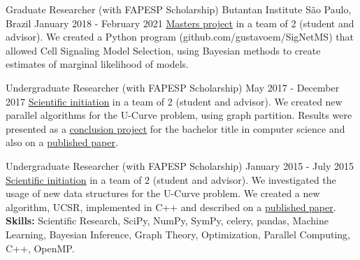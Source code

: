 \documentclass[11pt, a4paper]{awesome-cv-res}
\begin{document}
\begin{cventries}
\cventry
{Graduate Researcher (with FAPESP Scholarship)}
{Butantan Institute}
{São Paulo, Brazil}
{January 2018 - February 2021}
{\href{https://bv.fapesp.br/en/bolsas/175684/identification-of-cell-signaling-pathways-based-on-biochemical-reaction-kinetics-repositories/}
{\color{awesome}\underline {Masters project}} in a team of 2 (student 
    and advisor). We created a Python program 
    (github.com/gustavoem/SigNetMS) that allowed Cell Signaling Model
    Selection, using Bayesian methods to create estimates of marginal
    likelihood of models.
}

\cventry
{Undergraduate Researcher (with FAPESP Scholarship)}
{}
{}
{May 2017 - December 2017}
{\href{https://bv.fapesp.br/en/bolsas/170553/design-of-poset-forest-based-algorithms-for-the-u-curve-optimization-problem/}
{\color{awesome} \underline{Scientific initiation}} in a team of 2 
    (student and advisor). We created new parallel 
    algorithms for the U-Curve problem, using graph partition.  
    Results were presented as a
    \href{https://gustavoem.github.io/ucurve-pfs/index.html}{\color{awesome}
    \underline{conclusion project}} for the bachelor title in computer
    science and also on a
    \href{https://www.mdpi.com/1099-4300/22/4/492}{\color{awesome}\underline{published paper}}.}

\cventry
{Undergraduate Researcher (with FAPESP Scholarship)}
{}
{}
{January 2015 - July 2015}
{\href{https://bv.fapesp.br/en/bolsas/156441/studies-of-efficient-data-structures-to-tackle-the-u-curve-optimization-problem/}
{\color{awesome} \underline{Scientific initiation}} in a team of 2 
    (student and advisor). We investigated the usage of new  data 
    structures for the U-Curve problem. We created a  new algorithm, UCSR, implemented in C++ and described on a 
    \href{https://www.sciencedirect.com/science/article/pii/S0020025518306789?via\%3Dihub}
    {\color{awesome}\underline{published paper}}.
\newline\textbf{Skills:} Scientific Research, SciPy, NumPy, SymPy,
celery, pandas, Machine Learning, Bayesian Inference, Graph Theory,
Optimization, Parallel Computing, C++, OpenMP. 
}
\end{cventries}
\end{document}
